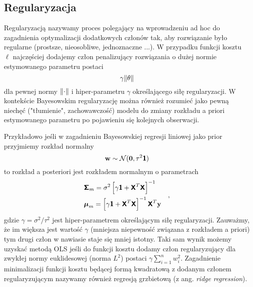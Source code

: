 \documentclass{myclass}
\begin{document}
\subsection{Regularyzacja}

Regularyzacją nazywamy proces polegający na wprowadzeniu ad hoc do zagadnienia optymalizacji
dodatkowych członów tak, aby rozwiązanie było regularne (prostsze, nieosobliwe, jednoznaczne ...). W
przypadku funkcji kosztu \(\ell\) najczęściej dodajemy człon penalizujący rozwiązania o dużej normie
estymowanego parametru postaci
\begin{equation*}
    \gamma\norm{\theta}
\end{equation*}
dla pewnej normy \(\norm{\cdot}\) i hiper-parametru \(\gamma\) określającego siłę regularyzacji. W
kontekście Bayesowskim regularyzację można również rozumieć jako pewną niechęć ("tłumienie",
zachowawczość) modelu do zmiany rozkładu a priori estymowanego parametru po pojawieniu się kolejnych
obserwacji.

Przykładowo jeśli w zagadnieniu Bayesowskiej regresji liniowej jako prior przyjmiemy rozkład
normalny
\begin{equation*}
    \mathbf{w} \sim \mathcal{N}(\mathbf{0}, \tau^2\boldsymbol{\mathsf{1}})
\end{equation*}
to rozkład a posteriori jest rozkładem normalnym o parametrach
\begin{equation*}
    \begin{split}
        &\boldsymbol{\mathsf{\Sigma}}_m = \sigma^2 \left[\gamma\boldsymbol{\mathsf{1}} + \boldsymbol{\mathsf{X}}^T\boldsymbol{\mathsf{X}}\right]^{-1}\\
        &\boldsymbol{\mu}_m = \left[\gamma\boldsymbol{\mathsf{1}} + \boldsymbol{\mathsf{X}}^T\boldsymbol{\mathsf{X}}\right]^{-1}\boldsymbol{\mathsf{X}}^T\mathbf{y}
    \end{split}\quad,
\end{equation*}
gdzie \(\gamma = \sigma^2 / \tau^2\) jest hiper-parametrem określającym siłę regularyzacji.
Zauważmy, że im większa jest wartość \(\gamma\) (mniejsza niepewność związana z rozkładem a priori)
tym drugi człon w nawiasie staje się mniej istotny. Taki sam wynik możemy uzyskać metodą OLS jeśli
do funkcji kosztu dodamy człon regularyzujący dla zwykłej normy euklidesowej (norma \(L^2\)) postaci
\(\gamma\sum_{i=1}^n w_i^2\). Zagadnienie minimalizacji funkcji kosztu będącej formą kwadratową z
dodanym członem regularyzującym nazywamy również regresją grzbietową (z ang. \textit{ridge
regression}).
\end{document}

